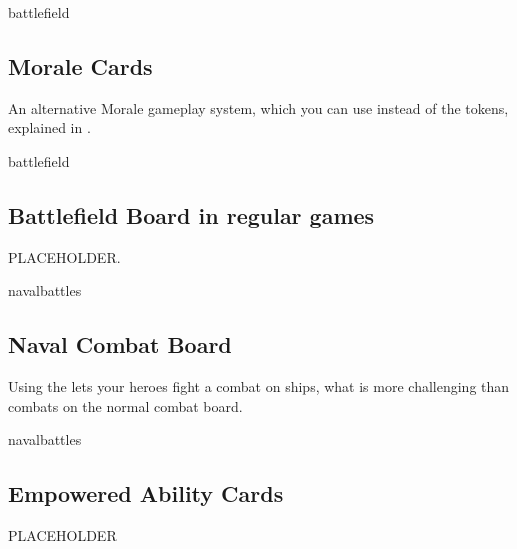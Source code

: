 \begin{multicols*}{2}
\vspace*{1em}
\begin{expansion}{battlefield}
	\subsection*{Morale Cards}
	An alternative Morale gameplay system, which you can use instead of the tokens, explained in .
\end{expansion}

\begin{expansion}{battlefield}
	\subsection*{Battlefield Board in regular games}
	PLACEHOLDER.
\end{expansion}

\vspace*{1em}
\begin{expansion}{navalbattles}
	\subsection*{Naval Combat Board}
	Using the  lets your heroes fight a combat on ships, what is more challenging than combats on the normal combat board.
\end{expansion}

\vspace*{1em}
\begin{expansion}{navalbattles}
	\subsection*{Empowered Ability Cards}
	PLACEHOLDER
\end{expansion}
\end{multicols*}


